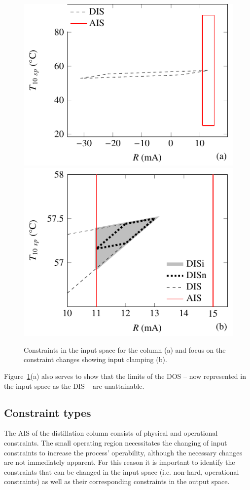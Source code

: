 \documentclass[final,authoryear,5pt,times,twocolumn]{elsarticle}
\begin{document}
\begin{figure}[htbp]
  \centering
    \includegraphics{figure4a.pdf}
    \includegraphics{figure4b.pdf}
  \caption{Constraints in the input space for the column (a) and focus on the constraint changes showing input clamping (b).}
  \label{fig:columnconsinput}
\end{figure}

Figure~\ref{fig:columnconsinput}(a) also serves to show that the limits of the DOS -- now represented in the input space as the DIS -- are unattainable.

\subsection{Constraint types}
The AIS of the distillation column consists of physical and operational constraints.
The small operating region necessitates the changing of input constraints to increase the process' operability, although the necessary changes are not immediately apparent.
For this reason it is important to identify the constraints that can be changed in the input space (i.e. non-hard, operational constraints) as well as their corresponding constraints in the output space.
\end{document}
